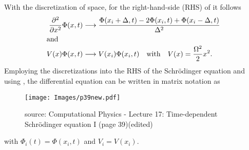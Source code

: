 With the discretization of space, for the right-hand-side (RHS) of  it follows
 \begin{align}
    {\partial^2 \over \partial x^2}  \Phi(x,t)  &\longrightarrow \frac{\Phi(x_i+\Delta,t) - 2 \Phi(x_i,t) + \Phi(x_i-\Delta,t)}{\Delta^2}\\
        \intertext{and}
      V(x)  \Phi(x,t)  &\longrightarrow V(x_i) \Phi(x_i,t) \quad \text{with} \quad V(x) = {\Omega ^2 \over 2} x^2.
\end{align}
\clearpage
\noindent Employing the discretizations into the RHS of the Schr\"odinger equation and using , the differential equation can be written in matrix notation as
\begin{figure}[h!]
    \centering
    \texttt{[image: Images/p39new.pdf]}
\caption*{\tiny{source: Computational Physics - Lecture 17:
Time-dependent Schr\"odinger equation I (page 39)(edited)}}
\end{figure}

\noindent with $\Phi_i(t) = \Phi(x_i, t)$ and $V_i = V(x_i)$.

